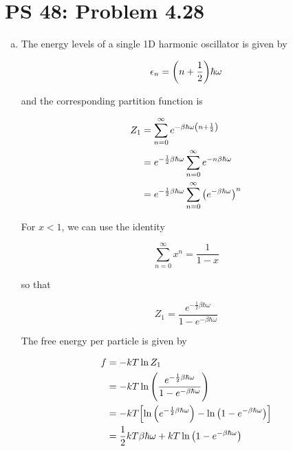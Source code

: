 \documentclass[12pt,a4paper,twocolumn]{article}
\begin{document}
\setcounter{page}{1}

\section*{PS 48: Problem 4.28}
\bigskip

\begin{enumerate}[(a)]

\item The energy levels of a single 1D harmonic oscillator is given by

\begin{equation}
	\epsilon_n = \qty(n + \frac{1}{2})\hbar\omega \label{eq:energy-levels}
\end{equation}

and the corresponding partition function is

\begin{align*}
	Z_1 &= \sum_{n=0}^\infty e^{-\beta\hbar\omega\qty(n+\frac{1}{2})} \\
	&= e^{-\frac{1}{2}\beta\hbar\omega} \sum_{n=0}^\infty e^{-n\beta\hbar\omega} \\
	&= e^{-\frac{1}{2}\beta\hbar\omega} \sum_{n=0}^\infty \qty(e^{-\beta\hbar\omega})^n
\end{align*}

For $x < 1$, we can use the identity

\begin{equation} \label{eq:geometric-identity}
	\sum_{n=0}^\infty x^n = \frac{1}{1-x}
\end{equation}

so that

\begin{equation}
	Z_1 = \frac{e^{-\frac{1}{2}\beta\hbar\omega}}{1 - e^{-\beta\hbar\omega}} \label{eq:partition}
\end{equation}

The free energy per particle is given by

\begin{align}
	f &= -kT \ln{Z_1} \label{eq:free-energy} \\
	&= -kT \ln\qty(\frac{e^{-\frac{1}{2}\beta\hbar\omega}}{1 - e^{-\beta\hbar\omega}}) \nonumber \\
	&= -kT \qty[\ln\qty(e^{-\frac{1}{2}\beta\hbar\omega}) - \ln\qty(1 - e^{-\beta\hbar\omega})] \nonumber \\
	&= \frac{1}{2}kT\beta\hbar\omega + kT\ln\qty(1 - e^{-\beta\hbar\omega})
\end{align}


\end{enumerate}
\end{document}
